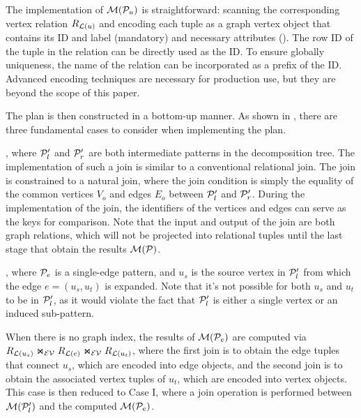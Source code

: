  The implementation of $\mathcal{M}(\mathcal{P}_u)$ is straightforward: scanning the corresponding vertex relation ${R_{\mathcal{L}(u)}}$ and encoding each tuple as a graph vertex object that contains its ID and label (mandatory) and necessary attributes (). The row ID of the tuple in the relation can be directly used as the ID. To ensure globally uniqueness, the name of the relation can be incorporated as a prefix of the ID. Advanced encoding techniques are necessary for production use, but they are beyond the scope of this paper.

The plan is then constructed in a bottom-up manner. As shown in , there are three fundamental cases to consider when implementing the plan.

, where $\mathcal{P}_l'$ and $\mathcal{P}'_r$ are both intermediate patterns in the decomposition tree. The implementation of such a join is similar to a conventional relational join. The join is constrained to a natural join, where the join condition is simply the equality of the common vertices $V_o$ and edges $E_o$ between $\mathcal{P}_l'$ and $\mathcal{P}_r'$. During the implementation of the join, the identifiers of the vertices and edges can serve as the keys for comparison. Note that the input and output of the join are both graph relations, which will not
be projected into relational tuples until the last stage that obtain the results $\mathcal{M}(\mathcal{P})$.

, where $\mathcal{P}_e$ is a single-edge pattern, and $u_s$ is the source vertex in $\mathcal{P}'_l$ from which the edge $e = (u_s, u_t)$ is expanded. Note that it's not possible for both $u_s$ and $u_t$ to be in $\mathcal{P}'_l$, as it would violate the fact that $\mathcal{P}'_l$ is either a single vertex or an induced sub-pattern.

When there is no graph index, the results of $\mathcal{M}(\mathcal{P}_e)$ are computed via $R_{\mathcal{L}(u_s)} \Join_\mathcal{EV} R_{\mathcal{L}(e)} \Join_\mathcal{EV} R_{\mathcal{L}(u_t)}$, 
where the first join is to obtain the edge tuples that connect $u_s$, which are encoded into edge objects, 
and the second join is to obtain the associated vertex tuples of $u_t$, which are encoded into vertex objects.
This case is then reduced to Case I, where a join operation is performed between $\mathcal{M}(\mathcal{P}'_l)$ and the computed $\mathcal{M}(\mathcal{P}_e)$.

